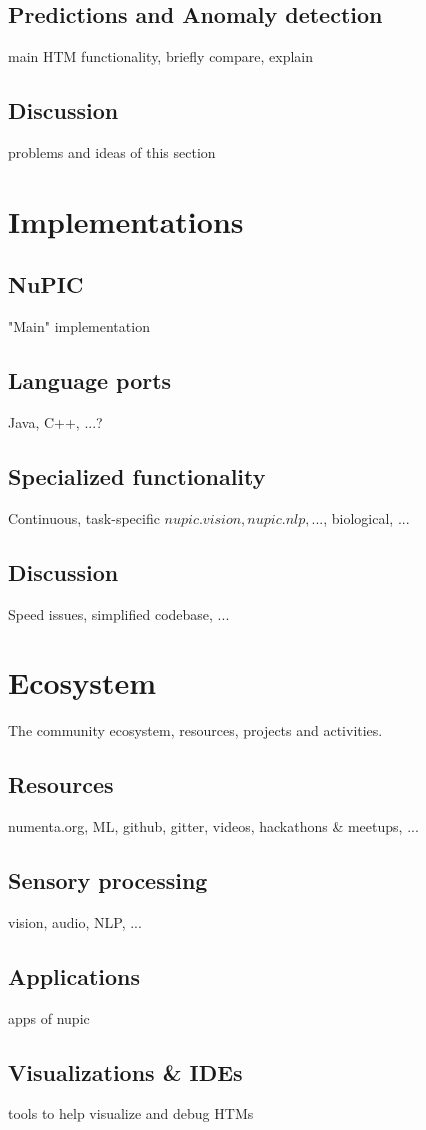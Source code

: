 \documentclass[a4,IEEEconf]{article}
\begin{document}
\subsection{Predictions and Anomaly detection}
main HTM functionality, briefly compare, explain
\subsection{Discussion}
problems and ideas of this section

\section{Implementations}
\subsection{NuPIC}
"Main" implementation
\subsection{Language ports}
Java, C++, ...?
\subsection{Specialized functionality}
Continuous, task-specific \(nupic.vision, nupic.nlp,...\), biological, ...
\subsection{Discussion}
Speed issues, simplified codebase, ...

\section{Ecosystem}
The community ecosystem, resources, projects and activities. 
\subsection{Resources}
numenta.org, ML, github, gitter, videos, hackathons \& meetups, ...
\subsection{Sensory processing}
vision, audio, NLP, ...
\subsection{Applications}
apps of nupic
\subsection{Visualizations \& IDEs}
tools to help visualize and debug HTMs
\end{document}
